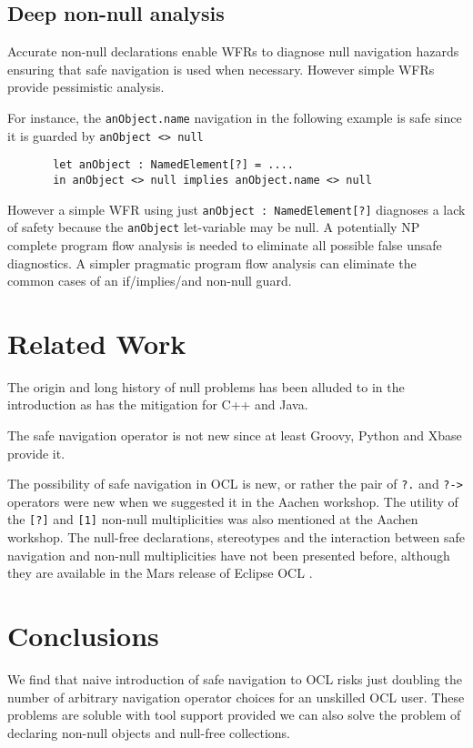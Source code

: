 \documentclass{llncs}
\begin{document}
\subsection{Deep non-null analysis}

Accurate non-null declarations enable WFRs to diagnose null navigation hazards ensuring that safe navigation is used when necessary. However simple WFRs provide pessimistic analysis.

For instance, the \verb$anObject.name$ navigation in the following example is safe since it is guarded by \verb$anObject <> null$

\begin{verbatim}
       let anObject : NamedElement[?] = .... 
       in anObject <> null implies anObject.name <> null
\end{verbatim}

However a simple WFR using just \verb$anObject : NamedElement[?]$ diagnoses a lack of safety because the \verb$anObject$ let-variable may be null. A potentially NP complete program flow analysis is needed to eliminate all possible false unsafe diagnostics. A simpler pragmatic program flow analysis can eliminate the common cases of an if/implies/and non-null guard.

\section{Related Work}\label{Related Work}

The origin and long history of null problems has been alluded to in the introduction as has the mitigation for C++ and Java.

The safe navigation operator is not new since at least Groovy, Python and Xbase provide it.

The possibility of safe navigation in OCL is new, or rather the pair of \verb$?.$ and \verb$?->$ operators were new when we suggested it in the Aachen workshop\cite{aachen}. The utility of the \verb$[?]$ and \verb$[1]$ non-null multiplicities was also mentioned at the Aachen workshop. The null-free declarations, stereotypes and the interaction between safe navigation and non-null multiplicities have not been presented before, although they are available in the Mars release of Eclipse OCL \cite{Mars-OCL}. 
%
\section{Conclusions}\label{Conclusions}
%
We find that naive introduction of safe navigation to OCL risks just doubling the number of arbitrary navigation operator choices for an unskilled OCL user. These problems are soluble with tool support provided we can also solve the problem of declaring non-null objects and null-free collections.
\end{document}

